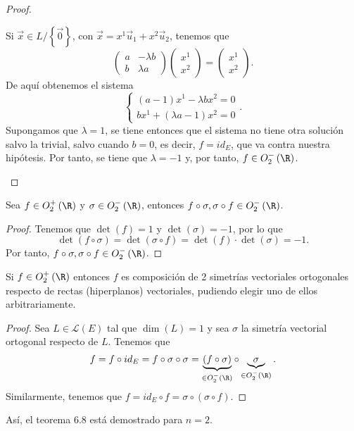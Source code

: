 \begin{proof}
\begin{description}
	Si $\displaystyle \vec{x} \in L/ \left\{ \vec{0}\right\}  $, con $\displaystyle \vec{x} = x^{1}\vec{u}_{1} + x^{2}\vec{u}_{2} $, tenemos que
	\[ \begin{pmatrix} a & - \lambda b \\ b & \lambda a \end{pmatrix} \begin{pmatrix} x^{1} \\ x^{2} \end{pmatrix} = \begin{pmatrix} x^{1} \\ x^{2} \end{pmatrix}.\]
De aquí obtenemos el sistema
\[ 
\begin{cases}
	\left(a-1\right)x^{1} - \lambda b x^{2} = 0 \\
	bx^{1} + \left(\lambda a - 1\right)x^{2} = 0
\end{cases}
.\]
Supongamos que $\displaystyle \lambda = 1 $, se tiene entonces que el sistema no tiene otra solución salvo la trivial, salvo cuando $\displaystyle b = 0 $, es decir, $\displaystyle f = id _{E} $, que va contra nuestra hipótesis. Por tanto, se tiene que $\displaystyle \lambda = - 1 $ y, por tanto, $\displaystyle f \in O^{-}_{2}\left(\R\right) $.
\end{description}
\end{proof}
\begin{flema}[]
\normalfont Sea $\displaystyle f \in O^{+}_{2}\left(\R\right) $ y $\displaystyle \sigma \in O^{-}_{2}\left(\R\right) $, entonces $\displaystyle f\circ \sigma, \sigma\circ f \in O^{-}_{2}\left(\R\right) $.
\end{flema}
\begin{proof}
Tenemos que $\displaystyle \det\left(f\right) = 1 $ y $\displaystyle \det\left(\sigma \right) = -1$, por lo que
\[ \det\left(f \circ \sigma \right) = \det\left(\sigma \circ f\right) = \det\left(f\right) \cdot \det\left(\sigma \right) = -1 .\]
Por tanto, $\displaystyle f \circ \sigma, \sigma \circ f \in O^{-}_{2}\left(\R\right) $.
\end{proof}
\begin{fcolorary}[]
\normalfont Si $\displaystyle f \in O^{+}_{2}\left(\R\right) $ entonces $\displaystyle f $ es composición de 2 simetrías vectoriales ortogonales respecto de rectas (hiperplanos) vectoriales, pudiendo elegir uno de ellos arbitrariamente.
\end{fcolorary}
\begin{proof}
Sea $\displaystyle L \in \mathcal{L}\left(E\right) $ tal que $\displaystyle \dim\left(L\right) = 1 $ y sea $\displaystyle \sigma  $ la simetría vectorial ortogonal respecto de $\displaystyle L $. Tenemos que
\[ f = f\circ id _{E} = f \circ \sigma \circ \sigma =  \underbrace{\left(f \circ \sigma \right)}_{ \in O^{-}_{2}\left(\R\right)}\circ \underbrace{\sigma}_{\in O^{-}_{2}\left(\R\right)}.\]
Similarmente, tenemos que $\displaystyle f = id _{E} \circ f = \sigma \circ \left(\sigma \circ f\right) $.
\end{proof}
\begin{observation}
\normalfont Así, el teorema 6.8 está demostrado para $\displaystyle n = 2 $.
\end{observation}
